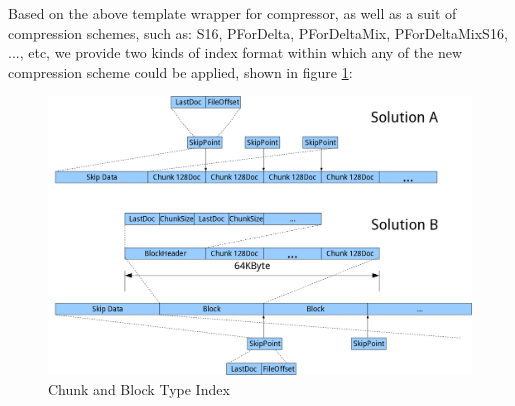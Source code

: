Based on the above template wrapper for compressor, as well as a suit of compression schemes, such as: S16, PForDelta, PForDeltaMix, PForDeltaMixS16, ..., etc, we provide
two kinds of index format within which any of the new compression scheme could be applied, shown in figure \ref{newindex}:

\begin{figure}[h!]
\centerline{\includegraphics[width=.8\textwidth]{Figures/newindex.png}}
\caption{Chunk and Block Type Index}\label{newindex}
\end{figure}

